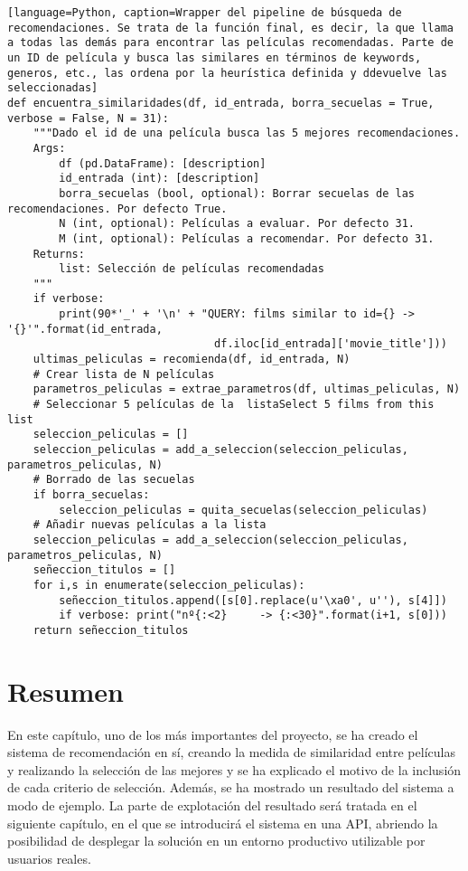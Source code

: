 \begin{lstlisting}[language=Python, caption=Wrapper del pipeline de búsqueda de recomendaciones. Se trata de la función final, es decir, la que llama a todas las demás para encontrar las películas recomendadas. Parte de un ID de película y busca las similares en términos de keywords, generos, etc., las ordena por la heurística definida y ddevuelve las seleccionadas]
def encuentra_similaridades(df, id_entrada, borra_secuelas = True, verbose = False, N = 31):
    """Dado el id de una película busca las 5 mejores recomendaciones.
    Args:
        df (pd.DataFrame): [description]
        id_entrada (int): [description]
        borra_secuelas (bool, optional): Borrar secuelas de las recomendaciones. Por defecto True.
        N (int, optional): Películas a evaluar. Por defecto 31.
        M (int, optional): Películas a recomendar. Por defecto 31.
    Returns:
        list: Selección de películas recomendadas
    """
    if verbose: 
        print(90*'_' + '\n' + "QUERY: films similar to id={} -> '{}'".format(id_entrada,
                                df.iloc[id_entrada]['movie_title']))
    ultimas_peliculas = recomienda(df, id_entrada, N)
    # Crear lista de N películas
    parametros_peliculas = extrae_parametros(df, ultimas_peliculas, N)
    # Seleccionar 5 películas de la  listaSelect 5 films from this list
    seleccion_peliculas = []
    seleccion_peliculas = add_a_seleccion(seleccion_peliculas, parametros_peliculas, N)
    # Borrado de las secuelas
    if borra_secuelas: 
        seleccion_peliculas = quita_secuelas(seleccion_peliculas)
    # Añadir nuevas películas a la lista
    seleccion_peliculas = add_a_seleccion(seleccion_peliculas, parametros_peliculas, N)
    señeccion_titulos = []
    for i,s in enumerate(seleccion_peliculas):
        señeccion_titulos.append([s[0].replace(u'\xa0', u''), s[4]])
        if verbose: print("nº{:<2}     -> {:<30}".format(i+1, s[0]))
    return señeccion_titulos
\end{lstlisting}

\section{Resumen}

En este capítulo, uno de los más importantes del proyecto, se ha creado el sistema de recomendación en sí, creando la medida de similaridad entre películas y realizando la selección de las mejores y se ha explicado el motivo de la inclusión de cada criterio de selección. Además, se ha mostrado un resultado del sistema a modo de ejemplo. La parte de explotación del resultado será tratada en el siguiente capítulo, en el que se introducirá el sistema en una API, abriendo la posibilidad de desplegar la solución en un entorno productivo utilizable por usuarios reales.